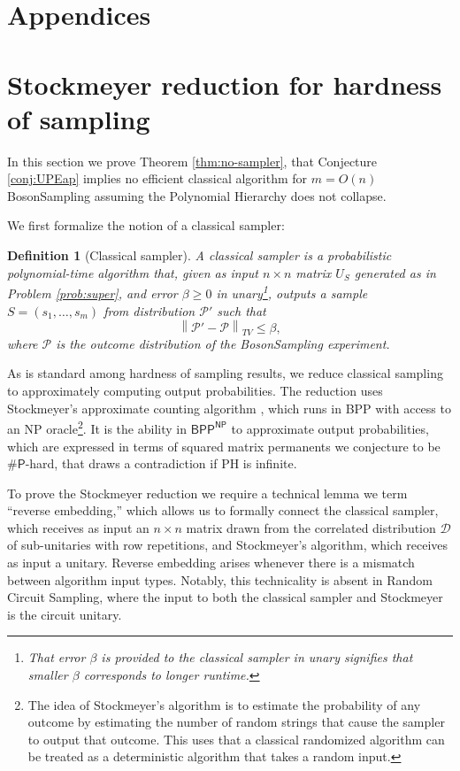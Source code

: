 \documentclass[11pt]{article}
\theoremstyle{plain}
\theoremstyle{plain}
\theoremstyle{plain}
\theoremstyle{plain}
\theoremstyle{plain}
\theoremstyle{plain}
\theoremstyle{plain}
\theoremstyle{remark}
\theoremstyle{remark}
\theoremstyle{plain}
\newtheorem{defn}{Definition}
\theoremstyle{plain}
\theoremstyle{plain}
\theoremstyle{plain}
\newcommand{\sharP}{\#\mathsf{P}}
\newcommand{\norm}[1]{\left\lVert#1\right\rVert}
\begin{document}



\newpage
\section*{Appendices}

\appendix

\section{Stockmeyer reduction for hardness of sampling}\label{sec:stockmeyer}

In this section we prove Theorem \ref{thm:no-sampler}, that Conjecture \ref{conj:UPEap} implies no efficient classical algorithm for $m=O(n)$ BosonSampling assuming the Polynomial Hierarchy does not collapse. 

We first formalize the notion of a classical sampler:

\begin{defn}[Classical sampler]\label{def:sampler}
A classical sampler is a probabilistic polynomial-time algorithm that, given as input $n\times n $ matrix $U_S$ generated as in Problem \ref{prob:super}, and error $\beta\geq0$ in unary\footnote{That error $\beta$ is provided to the classical sampler in unary signifies that smaller $\beta$ corresponds to longer runtime.}, outputs a sample $S=(s_1,\ldots,s_m)$ from distribution $\mathcal{P}'$ such that 
\[\norm{\mathcal{P}'-\mathcal{P}}_{TV} \leq \beta,\]
    where $\mathcal{P}$ is the outcome distribution of the BosonSampling experiment.
\end{defn}

As is standard among hardness of sampling results, we reduce classical sampling to approximately computing output probabilities. The reduction uses Stockmeyer's approximate counting algorithm \cite{stockmeyer1983complexity}, which runs in \textsf{BPP} with access to an \textsf{NP} oracle\footnote{The idea of Stockmeyer's algorithm is to estimate the probability of any outcome by estimating the number of random strings that cause the sampler to output that outcome. This uses that a classical randomized algorithm can be treated as a deterministic algorithm that takes a random input.}. It is the ability in $\mathsf{BPP}^\mathsf{NP}$ to approximate output probabilities, which are expressed in terms of squared matrix permanents we conjecture to be $\sharP$-hard, that draws a contradiction if \textsf{PH} is infinite.

To prove the Stockmeyer reduction we require a technical lemma we term ``reverse embedding,'' which allows us to formally connect the classical sampler, which receives as input an $n\times n$ matrix drawn from the correlated distribution $\mathcal{D}$ of sub-unitaries with row repetitions, and Stockmeyer's algorithm, which receives as input a unitary. Reverse embedding arises whenever there is a mismatch between algorithm input types. Notably, this technicality is absent in Random Circuit Sampling, where the input to both the classical sampler and Stockmeyer is the circuit unitary.
\end{document}
